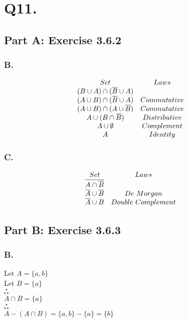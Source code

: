 \documentclass[titlepage]{article}\pagestyle{empty}
\def\therefore{\boldsymbol{\text{ }
\leavevmode
\lower0.4ex\hbox{$\cdot$}
\kern-.5em\raise0.7ex\hbox{$\cdot$}
\kern-0.55em\lower0.4ex\hbox{$\cdot$}
\thinspace\text{ }}}
\begin{document}
\pagebreak
\section*{Q11.}
\subsection*{Part A: Exercise 3.6.2} 
\subsubsection*{B.} 
\begin{displaymath}
\begin{array}{c c}
Set & Laws\\
(B \cup A) \cap (\overline{B} \cup A) & \\
(A \cup B) \cap (\overline{B} \cup A) & Commutative\\
(A \cup B) \cap (A \cup \overline{B}) & Commutative\\
A \cup (B \cap \overline{B}) & Distributive\\
A \cup \emptyset & Complement\\
A & Identity
\end{array}
\end{displaymath}
\subsubsection*{C.}	
\begin{displaymath}
\begin{array}{c c}
Set & Laws\\
\overline{A \cap \overline{B}} & \\
\overline{A} \cup \overline{B} & De\ Morgan\\
\overline{A} \cup B & Double\ Complement
\end{array}
\end{displaymath}
\subsection*{Part B: Exercise 3.6.3} 
\subsubsection*{B.} 
\begin{center}
Let $A = \{a, b\}$\\
Let $B = \{a\}$\\
$\therefore$\\ $A \cap B = \{a\}$\\
$\therefore$\\ $A - (A \cap B) = \{a,b\} - \{a\} = \{b\}$ 
\end{center}
\end{document}
